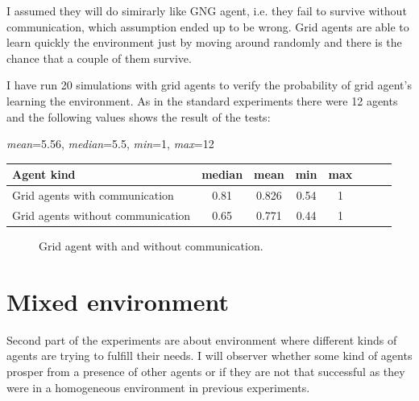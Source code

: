 I assumed they will do simirarly like GNG agent, i.e. they fail to survive without communication, which assumption ended up to be wrong. Grid agents are able to learn quickly the environment just by moving around randomly and there is the chance that a couple of them survive.

I have run 20 simulations with grid agents to verify the probability of grid agent's learning the environment. As in the standard experiments there were 12 agents and the following values shows the result of the tests:


\begin{center}   
  \emph{mean}=5.56, \emph{median}=5.5, \emph{min}=1, \emph{max}=12                 
\end{center}

\begin{center}   
  \begin{tabular}{l*{6}{c}r}
  Agent kind        & median & mean & min & max \\
  \hline  
  Grid agents with communication        & 0.81 & 0.826 & 0.54 & 1 \\
  Grid agents without communication        & 0.65 & 0.771 & 0.44 & 1 \\
  \end{tabular}                  
\end{center}



\begin{figure}[h!]
  \centering        
  \caption{Grid agent with and without communication.}           
  \label{experiments:gng}  
\end{figure} 

\clearpage

\section{Mixed environment}
                        
Second part of the experiments are about environment where different kinds of agents are trying to fulfill their needs. I will observer whether some kind of agents prosper from a presence of other agents or if they are not that successful as they were in a homogeneous environment in previous experiments.
                                                                                

